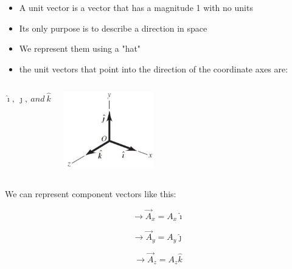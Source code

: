 \documentclass[]{beamer}
\begin{document}
\begin{frame}

\begin{itemize}
\item A unit vector is a vector that has a magnitude 1  with no units
\pause
\item  Its only purpose is  to describe a direction in space
\pause
\item We represent them using a "hat"
\pause
\item the unit vectors that point into the direction of the coordinate axes are:
\pause




\end{itemize}



   \begin{columns}[c]
   \column{2in}  %

\begin{equation*}
\hat{\imath},~\hat{\jmath},~and~\hat{k}
\end{equation*}

  
   \column{2in}




  \begin{center}
  \includegraphics[height=1.3in]{images/unit_vec_1.jpg}
\end{center}


   \end{columns}





 \end{frame}

\begin{frame}

We can represent component vectors like this:
\vspace{3mm}

\begin{equation*}
\rightarrow \vec{A}_x=A_x\hat{\imath}
\end{equation*}

\begin{equation*}
\rightarrow \vec{A}_y=A_y\hat{\jmath}
\end{equation*}


\begin{equation*}
\rightarrow \vec{A}_z=A_z\hat{k}
\end{equation*}

 \end{frame}
\end{document}
